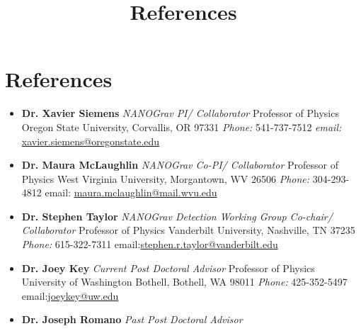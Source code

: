 \documentclass[11pt,letterpaper,sans,unicode]{moderncv}
\title{\huge{References}}
\newcommand{\blucirc}{{\color{color1} $\circ\;\;$}}
\begin{document}
\makecvtitle

\vspace{-13mm}

\section{References}

	\renewcommand\labelitemi{\blucirc}
	\begin{itemize}[leftmargin=8mm]
	\setlength\itemsep{0.05mm}
	\item \textbf{Dr. Xavier Siemens} \emph{NANOGrav PI/ Collaborator}
        		\newline Professor of Physics
		\newline Oregon State University, Corvallis, OR 97331
		\newline \emph{Phone:} 541-737-7512 \qquad \emph{email:} \url{xavier.siemens@oregonstate.edu}
		\newline
  \item \textbf{Dr. Maura McLaughlin} \emph{NANOGrav Co-PI/ Collaborator}
        		\newline Professor of Physics
		\newline West Virginia University, Morgantown, WV 26506
		\newline \emph{Phone:} 304-293-4812 \qquad email: \url{maura.mclaughlin@mail.wvu.edu}
		\newline
	\item \textbf{Dr. Stephen Taylor} \emph{NANOGrav Detection Working Group Co-chair/ Collaborator}
       		\newline Professor of Physics
		\newline Vanderbilt University, Nashville, TN 37235
		\newline \emph{Phone:} 615-322-7311 \qquad email:\url{stephen.r.taylor@vanderbilt.edu}
		\newline
	\item \textbf{Dr. Joey Key} \emph{Current Post Doctoral Advisor}
       		\newline Professor of Physics
		\newline University of Washington Bothell, Bothell, WA 98011
		\newline \emph{Phone:} 425-352-5497 \qquad email:\url{joeykey@uw.edu}
		\newline
	\item \textbf{Dr. Joseph Romano} \emph{Past Post Doctoral Advisor}

\end{itemize}
\end{document}
